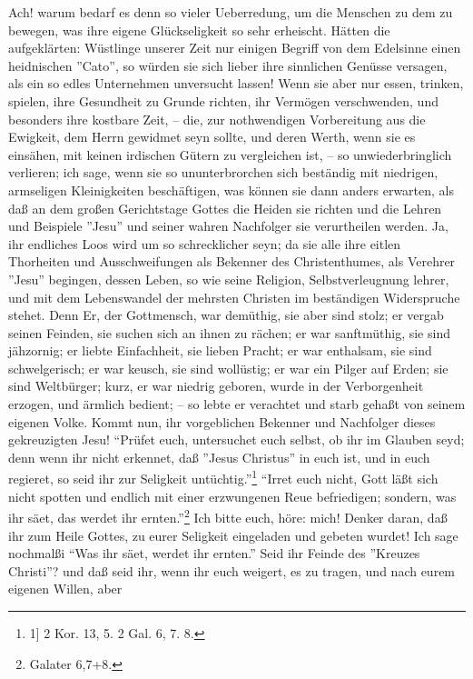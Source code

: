 Ach! warum bedarf es denn so vieler Ueberredung, um die Menschen zu dem zu
bewegen, was ihre eigene Glückseligkeit so sehr erheischt. Hätten die
aufgeklärten: Wüstlinge unserer Zeit nur einigen Begriff von dem Edelsinne einen
heidnischen ''Cato'', so würden sie sich lieber ihre sinnlichen Genüsse
versagen, als ein so edles Unternehmen unversucht lassen! Wenn sie aber nur
essen, trinken, spielen, ihre Gesundheit zu Grunde richten, ihr Vermögen
verschwenden, und besonders ihre kostbare Zeit, – die, zur nothwendigen
Vorbereitung aus die Ewigkeit, dem Herrn gewidmet seyn sollte, und deren Werth,
wenn sie es einsähen, mit keinen irdischen Gütern zu vergleichen ist, – so
unwiederbringlich verlieren; ich sage, wenn sie so ununterbrorchen sich
beständig mit niedrigen, armseligen Kleinigkeiten beschäftigen, was können sie
dann anders erwarten, als daß an dem großen Gerichtstage Gottes die Heiden sie
richten und die Lehren und Beispiele ''Jesu'' und seiner wahren Nachfolger sie
verurtheilen werden. Ja, ihr endliches Loos wird um so schrecklicher seyn; da
sie alle ihre eitlen Thorheiten und Ausschweifungen als Bekenner des
Christenthumes, als Verehrer ''Jesu'' begingen, dessen Leben, so wie seine
Religion, Selbstverleugnung lehrer, und mit dem Lebenswandel der mehrsten
Christen im beständigen Widerspruche stehet. Denn Er, der Gottmensch, war
demüthig, sie aber sind stolz; er vergab seinen Feinden, sie suchen sich an
ihnen zu rächen; er war sanftmüthig, sie sind jähzornig; er liebte Einfachheit,
sie lieben Pracht; er war enthalsam, sie sind schwelgerisch; er war keusch, sie
sind wollüstig; er war ein Pilger auf Erden; sie sind Weltbürger; kurz, er war
niedrig geboren, wurde in der Verborgenheit erzogen, und ärmlich  bedient; – so
lebte er verachtet und starb gehaßt von seinem eigenen Volke. Kommt nun, ihr
vorgeblichen Bekenner und Nachfolger dieses gekreuzigten Jesu! "`Prüfet euch,
untersuchet euch selbst, ob ihr im Glauben seyd; denn wenn ihr nicht erkennet,
daß ''Jesus Christus'' in euch ist, und in euch regieret, so seid ihr zur
Seligkeit untüchtig."'\footnote{1] 2 Kor. 13, 5. 2 Gal. 6, 7. 8.}  "`Irret euch
nicht, Gott läßt sich nicht spotten und endlich mit einer erzwungenen Reue
befriedigen; sondern, was ihr säet, das werdet ihr ernten."'\footnote{Galater
6,7+8.} Ich bitte euch, höre: mich! Denker daran, daß ihr zum Heile Gottes, zu
eurer Seligkeit eingeladen und gebeten wurdet! Ich sage nochmalßi "`Was ihr
säet, werdet ihr ernten."' Seid ihr Feinde des ''Kreuzes Christi''? und daß seid
ihr, wenn ihr euch weigert, es zu tragen, und nach eurem eigenen Willen, aber
